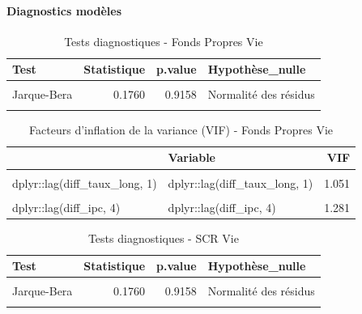 \documentclass[
]{article}
\begin{document}
\paragraph{Diagnostics modèles}\label{diagnostics-moduxe8les}

\begin{longtable}[t]{lrrl}
\caption{\label{tab:unnamed-chunk-50}Tests diagnostiques - Fonds Propres Vie}\\
\toprule
Test & Statistique & p.value & Hypothèse\_nulle\\
\midrule
\cellcolor{gray!10}{Ljung-Box} & \cellcolor{gray!10}{0.0971} & \cellcolor{gray!10}{0.7554} & \cellcolor{gray!10}{Pas d'autocorrélation}\\
Jarque-Bera & 0.1760 & 0.9158 & Normalité des résidus\\
\cellcolor{gray!10}{Breusch-Pagan} & \cellcolor{gray!10}{1.7255} & \cellcolor{gray!10}{0.7861} & \cellcolor{gray!10}{Homoscédasticité}\\
\bottomrule
\end{longtable}

\begin{longtable}[t]{llr}
\caption{\label{tab:unnamed-chunk-50}Facteurs d'inflation de la variance (VIF) - Fonds Propres Vie}\\
\toprule
 & Variable & VIF\\
\midrule
\cellcolor{gray!10}{dplyr::lag(diff\_fonds\_propres, 1)} & \cellcolor{gray!10}{dplyr::lag(diff\_fonds\_propres, 1)} & \cellcolor{gray!10}{1.309}\\
dplyr::lag(diff\_taux\_long, 1) & dplyr::lag(diff\_taux\_long, 1) & 1.051\\
\cellcolor{gray!10}{dplyr::lag(rendement\_sp500, 2)} & \cellcolor{gray!10}{dplyr::lag(rendement\_sp500, 2)} & \cellcolor{gray!10}{1.068}\\
dplyr::lag(diff\_ipc, 4) & dplyr::lag(diff\_ipc, 4) & 1.281\\
\bottomrule
\end{longtable}

\begin{longtable}[t]{lrrl}
\caption{\label{tab:unnamed-chunk-51}Tests diagnostiques - SCR Vie}\\
\toprule
Test & Statistique & p.value & Hypothèse\_nulle\\
\midrule
\cellcolor{gray!10}{Ljung-Box} & \cellcolor{gray!10}{0.0971} & \cellcolor{gray!10}{0.7554} & \cellcolor{gray!10}{Pas d'autocorrélation}\\
Jarque-Bera & 0.1760 & 0.9158 & Normalité des résidus\\
\cellcolor{gray!10}{Breusch-Pagan} & \cellcolor{gray!10}{1.7255} & \cellcolor{gray!10}{0.7861} & \cellcolor{gray!10}{Homoscédasticité}\\
\bottomrule
\end{longtable}
\end{document}
